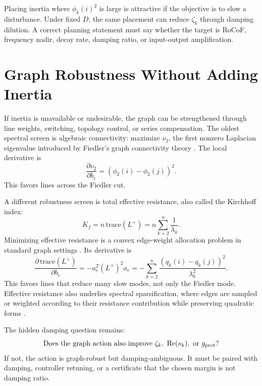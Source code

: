 \begin{example}
Placing inertia where \(\phi_k(i)^2\) is large is attractive if the objective
is to slow a disturbance. Under fixed \(D\), the same placement can reduce
\(\zeta_k\) through damping dilution. A correct planning statement must say
whether the target is RoCoF, frequency nadir, decay rate, damping ratio, or
input-output amplification.
\end{example}

\section{Graph Robustness Without Adding Inertia}

If inertia is unavailable or undesirable, the graph can be strengthened through
line weights, switching, topology control, or series compensation. The oldest
spectral screen is algebraic connectivity: maximize \(\nu_2\), the first
nonzero Laplacian eigenvalue introduced by Fiedler's graph connectivity theory
\cite{fiedler1973algebraic}. The local derivative is
\begin{equation}
  \frac{\partial\nu_2}{\partial b_e}
  =
  (\phi_2(i)-\phi_2(j))^2.
  \label{eq:fiedler_edge_score}
\end{equation}
This favors lines across the Fiedler cut.

A different robustness screen is total effective resistance, also called the
Kirchhoff index:
\begin{equation}
  K_f=n\,\mathrm{trace}(L^+)
  =
  n\sum_{k=2}^n\frac{1}{\lambda_k}.
  \label{eq:kirchhoff_index}
\end{equation}
Minimizing effective resistance is a convex edge-weight allocation problem in
standard graph settings \cite{ghosh2008effective}. Its derivative is
\begin{equation}
  \frac{\partial\,\mathrm{trace}(L^+)}{\partial b_e}
  =
  -a_e^T(L^+)^2a_e
  =
  -\sum_{k=2}^n
  \frac{(q_k(i)-q_k(j))^2}{\lambda_k^2}.
  \label{eq:effective_resistance_derivative}
\end{equation}
This favors lines that reduce many slow modes, not only the Fiedler mode.
Effective resistance also underlies spectral sparsification, where edges are
sampled or weighted according to their resistance contribution while preserving
quadratic forms \cite{spielman2011sparsification}.

The hidden damping question remains:
\begin{equation}
  \hbox{Does the graph action also improve }
  \zeta_k,\ \operatorname{Re}(s_k),\hbox{ or }g_{\rm prot}?
  \label{eq:graph_hidden_question}
\end{equation}
If not, the action is graph-robust but damping-ambiguous. It must be paired
with damping, controller retuning, or a certificate that the chosen margin is
not damping ratio.

